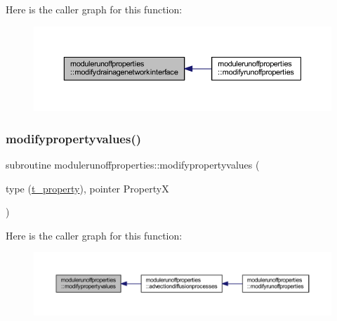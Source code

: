 Here is the caller graph for this function\+:\nopagebreak
\begin{figure}[H]
\begin{center}
\leavevmode
\includegraphics[width=350pt]{namespacemodulerunoffproperties_af923d884ffbf9570877d94db798722ef_icgraph}
\end{center}
\end{figure}
\mbox{\label{namespacemodulerunoffproperties_ad0713aee47ec52341e436c46ac2a4fd6}} 
\subsubsection{\texorpdfstring{modifypropertyvalues()}{modifypropertyvalues()}}
{\footnotesize\ttfamily subroutine modulerunoffproperties\+::modifypropertyvalues (\begin{DoxyParamCaption}\item[{type (\mbox{\hyperlink{structmodulerunoffproperties_1_1t__property}{t\+\_\+property}}), pointer}]{PropertyX }\end{DoxyParamCaption})\hspace{0.3cm}{\ttfamily [private]}}

Here is the caller graph for this function\+:\nopagebreak
\begin{figure}[H]
\begin{center}
\leavevmode
\includegraphics[width=350pt]{namespacemodulerunoffproperties_ad0713aee47ec52341e436c46ac2a4fd6_icgraph}
\end{center}
\end{figure}
\mbox{\label{namespacemodulerunoffproperties_ac6419261cb4a595997e6f2b480bd1b27}} 
